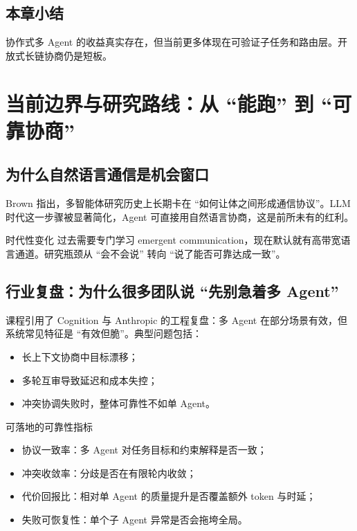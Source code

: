 \documentclass[a4paper]{article}
\begin{document}
\subsection{本章小结}
协作式多 Agent 的收益真实存在，但当前更多体现在可验证子任务和路由层。开放式长链协商仍是短板。

\section{当前边界与研究路线：从 ``能跑'' 到 ``可靠协商''}

\subsection{为什么自然语言通信是机会窗口}
Brown 指出，多智能体研究历史上长期卡在 ``如何让体之间形成通信协议''。LLM 时代这一步骤被显著简化，Agent 可直接用自然语言协商，这是前所未有的红利。

\begin{importantbox}{时代性变化}
过去需要专门学习 emergent communication，现在默认就有高带宽语言通道。研究瓶颈从 ``会不会说'' 转向 ``说了能否可靠达成一致''。
\end{importantbox}

\subsection{行业复盘：为什么很多团队说 ``先别急着多 Agent''}
课程引用了 Cognition 与 Anthropic 的工程复盘：多 Agent 在部分场景有效，但系统常见特征是 ``有效但脆''。典型问题包括：
\begin{itemize}
    \item 长上下文协商中目标漂移；
    \item 多轮互审导致延迟和成本失控；
    \item 冲突协调失败时，整体可靠性不如单 Agent。
\end{itemize}

\begin{knowledgebox}{可落地的可靠性指标}
\begin{itemize}
    \item 协议一致率：多 Agent 对任务目标和约束解释是否一致；
    \item 冲突收敛率：分歧是否在有限轮内收敛；
    \item 代价回报比：相对单 Agent 的质量提升是否覆盖额外 token 与时延；
    \item 失败可恢复性：单个子 Agent 异常是否会拖垮全局。
\end{itemize}
\end{knowledgebox}
\end{document}
